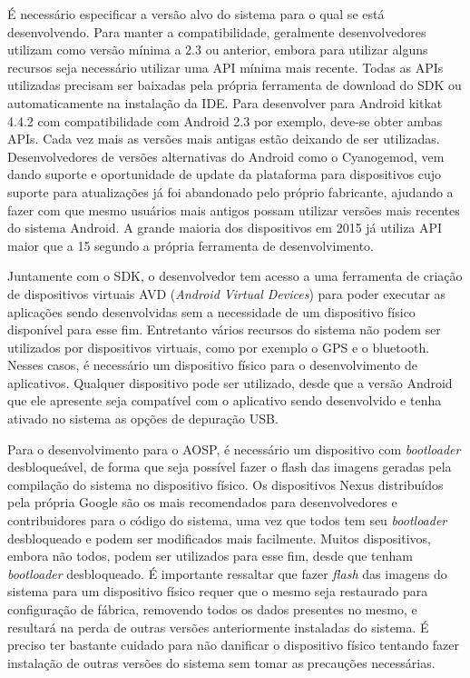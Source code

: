 É necessário especificar a versão alvo do sistema para o qual se está desenvolvendo. Para manter a compatibilidade, geralmente desenvolvedores utilizam como versão mínima a 2.3 ou anterior, embora para utilizar alguns recursos seja necessário utilizar uma API mínima mais recente. Todas as APIs utilizadas precisam ser baixadas pela própria ferramenta de download do SDK ou automaticamente na instalação da IDE. Para desenvolver para Android kitkat 4.4.2 com compatibilidade com Android 2.3 por exemplo, deve-se obter ambas APIs. Cada vez mais as versões mais antigas estão deixando de ser utilizadas. Desenvolvedores de versões alternativas do Android como o Cyanogemod, vem dando suporte e oportunidade de update da plataforma para dispositivos cujo suporte para atualizações já foi abandonado pelo próprio fabricante, ajudando a fazer com que mesmo usuários mais antigos possam utilizar versões mais recentes do sistema Android. A grande maioria dos dispositivos em 2015 já utiliza API maior que a 15 segundo a própria ferramenta de desenvolvimento.

Juntamente com o SDK, o desenvolvedor tem acesso a uma ferramenta de criação de dispositivos virtuais AVD (\textit{Android Virtual Devices}) para poder executar as aplicações sendo desenvolvidas sem a necessidade de um dispositivo físico disponível para esse fim. Entretanto vários recursos do sistema não podem ser utilizados por dispositivos virtuais, como por exemplo o GPS e o bluetooth. Nesses casos, é necessário um dispositivo físico para o desenvolvimento de aplicativos. Qualquer dispositivo pode ser utilizado, desde que a versão Android que ele apresente seja compatível com o aplicativo sendo desenvolvido e tenha ativado no sistema as opções de depuração USB. 

Para o desenvolvimento para o AOSP, é necessário um dispositivo com \textit{bootloader} desbloqueável, de forma que seja possível fazer o flash das imagens geradas pela compilação do sistema no dispositivo físico. Os dispositivos Nexus distribuídos pela própria Google são os mais recomendados para desenvolvedores e contribuidores para o código do sistema, uma vez que todos tem seu \textit{bootloader} desbloqueado e podem ser modificados mais facilmente. Muitos dispositivos, embora não todos, podem ser utilizados para esse fim, desde que tenham \textit{bootloader} desbloqueado. É importante ressaltar que fazer \textit{flash} das imagens do sistema para um dispositivo físico requer que o mesmo seja restaurado para configuração de fábrica, removendo todos os dados presentes no mesmo, e resultará na perda de outras versões anteriormente instaladas do sistema. É preciso ter bastante cuidado para não danificar o dispositivo físico tentando fazer instalação de outras versões do sistema sem tomar as precauções necessárias.

